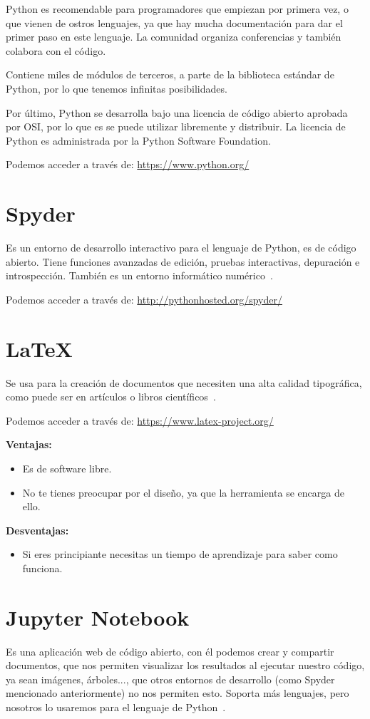 Python es recomendable para programadores que empiezan por primera vez, o que vienen de ostros lenguajes, ya que hay mucha documentación para dar el primer paso en este lenguaje. La comunidad organiza conferencias y también colabora con el código.

Contiene miles de módulos de terceros, a parte de la biblioteca estándar de Python, por lo que tenemos infinitas posibilidades.

Por último, Python se desarrolla bajo una licencia de código abierto aprobada por OSI, por lo que es se puede utilizar libremente y distribuir. La licencia de Python es administrada por la Python Software Foundation. 

Podemos acceder a través de: 
\url{https://www.python.org/}

\section{Spyder}
Es un entorno de desarrollo interactivo para el lenguaje de Python, es de código abierto.
Tiene funciones avanzadas de edición, pruebas interactivas, depuración e introspección. También es un entorno informático numérico~\cite{spyder}.

Podemos acceder a través de: 
\url{http://pythonhosted.org/spyder/}

\section{\LaTeX}
Se usa para la creación de documentos que necesiten una alta calidad tipográfica, como puede ser en artículos o libros científicos~\cite{latex}.

Podemos acceder a través de: 
\url{https://www.latex-project.org/}

\textbf{Ventajas:}
\begin{itemize}
\item Es de software libre.
\item No te tienes preocupar por el diseño, ya que la herramienta se encarga de ello.
\end{itemize}

\textbf{Desventajas:}
\begin{itemize}
\item Si eres principiante necesitas un tiempo de aprendizaje para saber como funciona.
\end{itemize}

\section{Jupyter Notebook}
Es una aplicación web de código abierto, con él podemos crear y compartir documentos, que nos permiten visualizar los resultados al ejecutar nuestro código, ya sean imágenes, árboles..., que otros entornos de desarrollo (como Spyder mencionado anteriormente) no nos permiten esto.
Soporta más lenguajes, pero nosotros lo usaremos para el lenguaje de Python~\cite{jupyter}.

